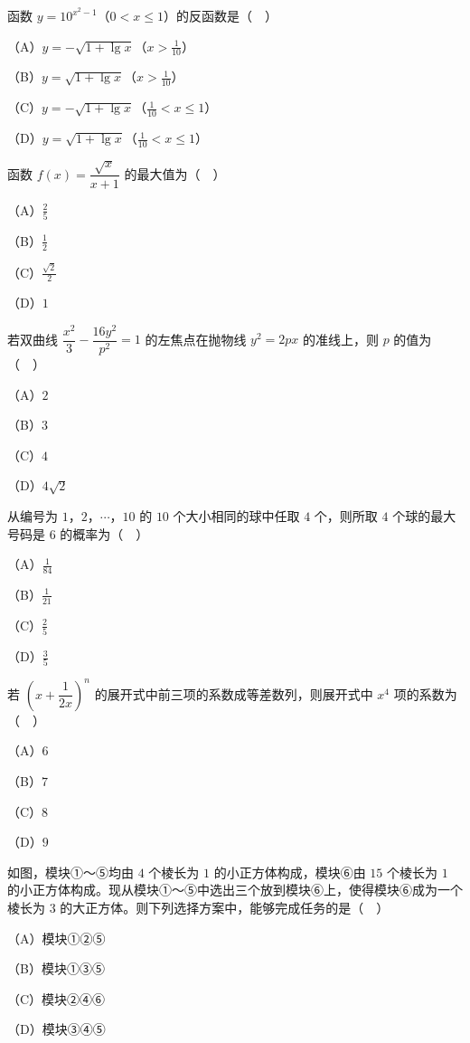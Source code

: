 \begin{question}
函数 $y=10^{x^2-1}$（$0<x\leqslant1$）的反函数是（　）

（A）$y=-\sqrt{1+\lg x}$（$x>\frac1{10}$）

（B）$y=\sqrt{1+\lg x}$（$x>\frac1{10}$）

（C）$y=-\sqrt{1+\lg x}$（$\frac1{10}<x\leqslant1$）

（D）$y=\sqrt{1+\lg x}$（$\frac1{10}<x\leqslant1$）

\end{question}
\begin{question}
函数 $f(x)=\dfrac{\sqrt x}{x+1}$ 的最大值为（　）

（A）$\frac25$

（B）$\frac12$

（C）$\frac{\sqrt2}2$

（D）$1$

\end{question}
\begin{question}
若双曲线 $\dfrac{x^2}3-\dfrac{16y^2}{p^2}=1$ 的左焦点在抛物线 $y^2=2px$ 的准线上，则 $p$ 的值为（　）

（A）$2$

（B）$3$

（C）$4$

（D）$4\sqrt2$

\end{question}
\begin{question}
从编号为 $1$，$2$，$\cdots$，$10$ 的 $10$ 个大小相同的球中任取 $4$ 个，则所取 $4$ 个球的最大号码是 $6$ 的概率为（　）

（A）$\frac1{84}$

（B）$\frac1{21}$

（C）$\frac25$

（D）$\frac35$

\end{question}
\begin{question}
若 $\left(x+\dfrac1{2x}\right)^n$ 的展开式中前三项的系数成等差数列，则展开式中 $x^4$ 项的系数为（　）

（A）$6$

（B）$7$

（C）$8$

（D）$9$

\Needspace{0.4\textheight}
\end{question}
\begin{question}
如图，模块①～⑤均由 $4$ 个棱长为 $1$ 的小正方体构成，模块⑥由 $15$ 个棱长为 $1$ 的小正方体构成。现从模块①～⑤中选出三个放到模块⑥上，使得模块⑥成为一个棱长为 $3$ 的大正方体。则下列选择方案中，能够完成任务的是（　）
\nopagebreak[4]
\begin{center}\end{center}
\nopagebreak[4]
（A）模块①②⑤

（B）模块①③⑤

（C）模块②④⑥

（D）模块③④⑤

\end{question}
